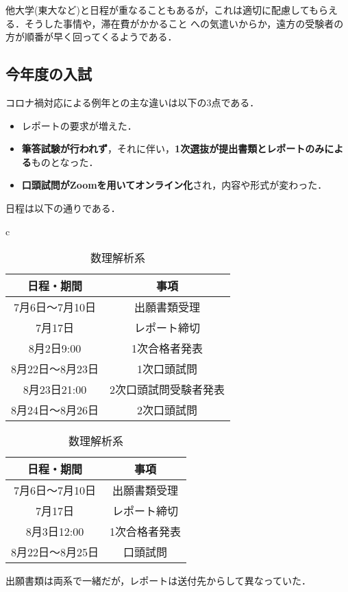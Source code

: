 \documentclass[uplatex]{jsarticle}
\begin{document}
他大学(東大など)と日程が重なることもあるが，これは適切に配慮してもらえる．そうした事情や，滞在費がかかること
への気遣いからか，遠方の受験者の方が順番が早く回ってくるようである．
\subsection*{今年度の入試}
コロナ禍対応による例年との主な違いは以下の3点である．
\begin{itemize}
	\item レポートの要求が増えた．
	\item \textbf{筆答試験が行われず}，それに伴い，\textbf{1次選抜が提出書類とレポートのみによる}ものとなった．
	\item \textbf{口頭試問がZoomを用いてオンライン化}され，内容や形式が変わった．
\end{itemize}
日程は以下の通りである．
\begin{table}[h]
	\begin{tabular}{c}
\begin{minipage}{0.5\hsize}
		\begin{center}
			\captionsetup{labelformat=empty,labelsep=none}
			\caption{数学系}
			\begin{tabular}{|c|c|} \hline
				日程・期間 & 事項 \\ \hline \hline
				7月6日～7月10日 & 出願書類受理 \quad \\ \hline
				7月17日 & レポート締切 \quad \\ \hline
				8月2日9:00 & 1次合格者発表 \quad \\ \hline
				8月22日～8月23日 & 1次口頭試問 \quad \\ \hline
				8月23日21:00 & 2次口頭試問受験者発表 \quad \\ \hline
				8月24日～8月26日 & 2次口頭試問 \quad \\ \hline
			\end{tabular}
		\end{center}
\end{minipage}
\begin{minipage}{0.55\hsize}
		\begin{center}
			\captionsetup{labelformat=empty,labelsep=none}
			\caption{数理解析系}
			\begin{tabular}{|c|c|} \hline
				日程・期間 & 事項 \\ \hline \hline
				7月6日～7月10日 & 出願書類受理 \quad \\ \hline
				7月17日 & レポート締切 \quad \\ \hline
				8月3日12:00 & 1次合格者発表 \quad \\ \hline
				8月22日～8月25日 & 口頭試問 \quad \\ \hline
			\end{tabular}
		\end{center}
\end{minipage}
\end{tabular}
\end{table}
出願書類は両系で一緒だが，レポートは送付先からして異なっていた．
\end{document}
